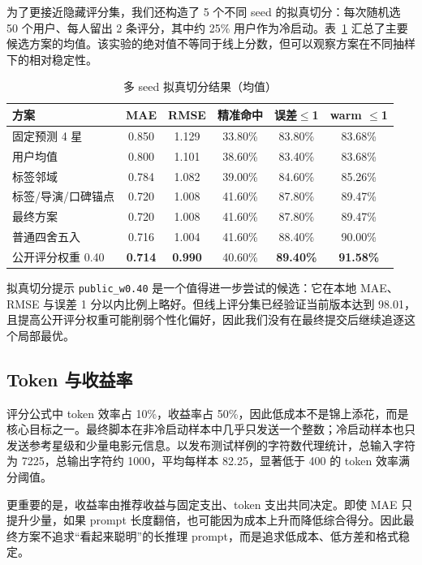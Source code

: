 \documentclass[UTF8,a4paper,10pt,fontset=none]{ctexart}
\begin{document}
为了更接近隐藏评分集，我们还构造了 5 个不同 seed 的拟真切分：每次随机选 50 个用户、每人留出 2 条评分，其中约 25\% 用户作为冷启动。表~\ref{tab:cv_summary} 汇总了主要候选方案的均值。该实验的绝对值不等同于线上分数，但可以观察方案在不同抽样下的相对稳定性。

\begin{table}[htbp]
    \centering
    \setlength{\tabcolsep}{4.5pt}
    \caption{多 seed 拟真切分结果（均值）}
    \label{tab:cv_summary}
    \small
    \begin{tabular}{@{}lccccc@{}}
        \toprule
        \textbf{方案} & \textbf{MAE} & \textbf{RMSE} & \textbf{精准命中} & \textbf{误差$\le$1} & \textbf{warm $\le$1} \\
        \midrule
        固定预测 4 星 & 0.850 & 1.129 & 33.80\% & 83.80\% & 83.68\% \\
        用户均值 & 0.800 & 1.101 & 38.60\% & 83.40\% & 83.68\% \\
        标签邻域 & 0.784 & 1.082 & 39.00\% & 84.60\% & 85.26\% \\
        标签/导演/口碑锚点 & 0.720 & 1.008 & 41.60\% & 87.80\% & 89.47\% \\
        最终方案 & 0.720 & 1.008 & 41.60\% & 87.80\% & 89.47\% \\
        普通四舍五入 & 0.716 & 1.004 & 41.60\% & 88.40\% & 90.00\% \\
        公开评分权重 0.40 & \textbf{0.714} & \textbf{0.990} & 40.60\% & \textbf{89.40\%} & \textbf{91.58\%} \\
        \bottomrule
    \end{tabular}
\end{table}

拟真切分提示 \texttt{public\_w0.40} 是一个值得进一步尝试的候选：它在本地 MAE、RMSE 与误差 1 分以内比例上略好。但线上评分集已经验证当前版本达到 98.01，且提高公开评分权重可能削弱个性化偏好，因此我们没有在最终提交后继续追逐这个局部最优。

\subsection{Token 与收益率}

评分公式中 token 效率占 10\%，收益率占 50\%，因此低成本不是锦上添花，而是核心目标之一。最终脚本在非冷启动样本中几乎只发送一个整数；冷启动样本也只发送参考星级和少量电影元信息。以发布测试样例的字符数代理统计，总输入字符为 7225，总输出字符约 1000，平均每样本 82.25，显著低于 400 的 token 效率满分阈值。

更重要的是，收益率由推荐收益与固定支出、token 支出共同决定。即使 MAE 只提升少量，如果 prompt 长度翻倍，也可能因为成本上升而降低综合得分。因此最终方案不追求``看起来聪明''的长推理 prompt，而是追求低成本、低方差和格式稳定。
\end{document}
